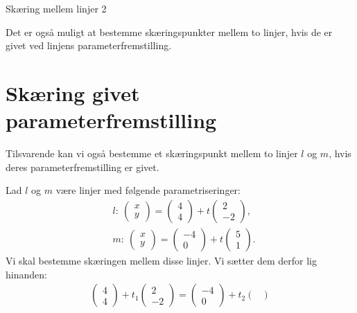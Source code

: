 
\begin{center}
\Huge
Skæring mellem linjer 2
\end{center}

Det er også muligt at bestemme skæringspunkter mellem to linjer, hvis de er givet ved linjens parameterfremstilling. 
\section*{Skæring givet parameterfremstilling}
Tilsvarende kan vi også bestemme et skæringspunkt mellem to linjer $l$ og $m$, hvis deres parameterfremstilling er givet. 
\begin{exa}
	Lad $l$ og $m$ være linjer med følgende parametriseringer:
	\begin{align*}
		&l: \ 
		\begin{pmatrix}
			x \\ y
		\end{pmatrix} = 
		\begin{pmatrix}
			4 \\ 4
		\end{pmatrix} + t
		\begin{pmatrix}
			2 \\ -2
		\end{pmatrix},\\
		&m: \ 
		\begin{pmatrix}
			x \\ y 
		\end{pmatrix} = 
		\begin{pmatrix}
			-4 \\ 0
		\end{pmatrix} + t
		\begin{pmatrix}
			5 \\ 1
		\end{pmatrix}.
	\end{align*}
	Vi skal bestemme skæringen mellem disse linjer. Vi sætter dem derfor lig hinanden:
	\begin{align*}
		\begin{pmatrix}
			4 \\ 4
		\end{pmatrix} + t_1
		\begin{pmatrix}
			2 \\ -2
		\end{pmatrix} =
		\begin{pmatrix}
			-4 \\ 0
		\end{pmatrix} + t_2
		\begin{pmatrix}

\end{pmatrix}
\end{align*}
\end{exa}
